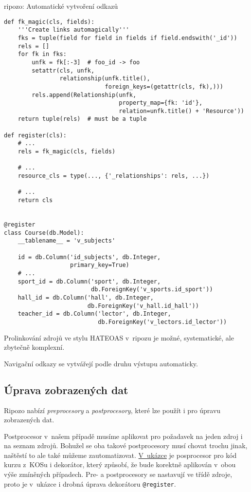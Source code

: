 \begin{listing}[htbp]
\caption{{\label{code:ripozo:links}ripozo: Automatické vytvoření odkazů}}
\begin{verbatim}
def fk_magic(cls, fields):
    '''Create links automagically'''
    fks = tuple(field for field in fields if field.endswith('_id'))
    rels = []
    for fk in fks:
        unfk = fk[:-3]  # foo_id -> foo
        setattr(cls, unfk,
                relationship(unfk.title(),
                             foreign_keys=(getattr(cls, fk),)))
        rels.append(Relationship(unfk,
                                 property_map={fk: 'id'},
                                 relation=unfk.title() + 'Resource'))
    return tuple(rels)  # must be a tuple

def register(cls):
    # ...
    rels = fk_magic(cls, fields)
    
    # ...
    resource_cls = type(..., {'_relationships': rels, ...})
    
    # ...
    return cls


@register
class Course(db.Model):
    __tablename__ = 'v_subjects'

    id = db.Column('id_subjects', db.Integer,
                   primary_key=True)
    # ...
    sport_id = db.Column('sport', db.Integer,
                         db.ForeignKey('v_sports.id_sport'))
    hall_id = db.Column('hall', db.Integer,
                        db.ForeignKey('v_hall.id_hall'))
    teacher_id = db.Column('lector', db.Integer,
                           db.ForeignKey('v_lectors.id_lector'))
\end{verbatim}
\end{listing}

Prolinkování zdrojů ve stylu HATEOAS v~ripozu je možné, systematické, ale zbytečně komplexní.

Navigační odkazy se vytvářejí podle druhu výstupu automaticky.

\subsection{Úprava zobrazených dat}\label{uxfaprava-zobrazenuxfdch-dat}

Ripozo nabízí \emph{preprocesory} a \emph{postprocesory}, které lze použít i pro úpravu zobrazených dat.

Postprocesor v~našem případě musíme aplikovat pro požadavek na jeden zdroj i na seznam zdrojů. Bohužel se oba takové postprocesory musí chovat trochu jinak, naštěstí to ale také můžeme zautomatizovat. \protect\hyperlink{code:ripozo:modify}{V~ukázce} je posprocesor pro kód kurzu z~KOSu i dekorátor, který způsobí, že bude korektně aplikován v~obou výše zmíněných případech. Pre- a postprocesory se nastavují ve třídě zdroje, proto je v~ukázce i drobná úprava dekorátoru \verb!@register!.

